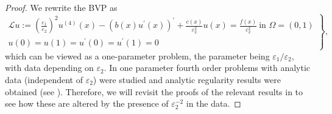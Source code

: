 \documentclass[12pt]{article}
\newcommand{\eps}{\varepsilon}
\begin{document}
\begin{proof}
%
We rewrite the BVP as
%
\begin{equation}\label{eq:bvp_sa}
\left.
\begin{gathered}
\mathcal{L}u:=\left(\frac{\varepsilon _{1}}{\varepsilon _{2}}\right)^2 u^{(4)}(x)-\left( b(x)u^{\prime
}(x)\right) ^{\prime }+\frac{c(x)}{\eps_2^2} u(x) =\frac{f(x)}{\eps_2^2}\ \text{in }\Omega =\left( 0,1\right)   \\
u(0)=u(1)=u^{\prime }(0)=u^{\prime }(1) =0
\end{gathered}
\right\},
\end{equation}
%
which can be viewed as a one-parameter problem, the parameter being $\eps_1 / \eps_2$, with data depending on $\eps_2$. In \cite{PC, PCarXiv} one parameter fourth order problems with analytic data (independent of $\eps_2$) were studied and analytic regularity results were obtained (see \cite[Thm. 7]{PCarXiv}). Therefore, we will revisit the proofs of the relevant results in \cite{PCarXiv} to see how these are altered by the presence of $\eps^{-2}_2$ in the data.


\end{proof}
\end{document}

